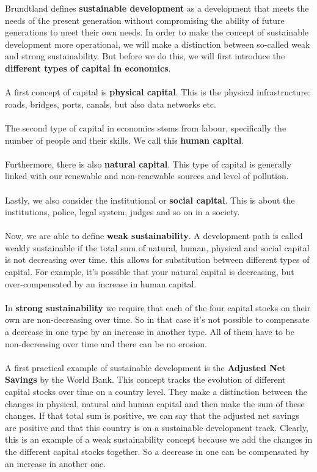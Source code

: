 \documentclass[../summary.tex]{subfiles}
\begin{document}
	Brundtland defines \textbf{sustainable development} as a development that meets the needs of the present generation without compromising the ability of future generations to meet their own needs. In order to make the concept of sustainable development more operational, we will make a distinction between so-called weak and strong sustainability. But before we do this, we will first introduce the \textbf{different types of capital in economics}.
	\\\\
	A first concept of capital is \textbf{physical capital}. This is the physical infrastructure: roads, bridges, ports, canals, but also data networks etc.
	\\\\
	The second type of capital in economics stems from labour, specifically the number of people and their skills. We call this \textbf{human capital}.
	\\\\
	Furthermore, there is also \textbf{natural capital}. This type of capital is generally linked with our renewable and non-renewable sources and level of pollution.
	\\\\
	Lastly, we also consider the institutional or \textbf{social capital}. This is about the institutions, police, legal system, judges and so on in a society.
	\\\\
	Now, we are able to define \textbf{weak sustainability}. A development path is called weakly sustainable if the total sum of natural, human, physical and social capital is not decreasing over time. this allows for substitution between different types of capital. For example, it's possible that your natural capital is decreasing, but over-compensated by an increase in human capital.
	\\\\
	In \textbf{strong sustainability} we require that each of the four capital stocks on their own are non-decreasing over time. So in that case it's not possible to compensate a decrease in one type by an increase in another type. All of them have to be non-decreasing over time and there can be no erosion.
	\\\\
	A first practical example of sustainable development is the \textbf{Adjusted Net Savings} by the World Bank. This concept tracks the evolution of different capital stocks over time on a country level. They make a distinction between the changes in physical, natural and human capital and then make the sum of these changes. If that total sum is positive, we can say that the adjusted net savings are positive and that this country is on a sustainable development track. Clearly, this is an example of a weak sustainability concept because we add the changes in the different capital stocks together. So a decrease in one can be compensated by an increase in another one.
\end{document}

